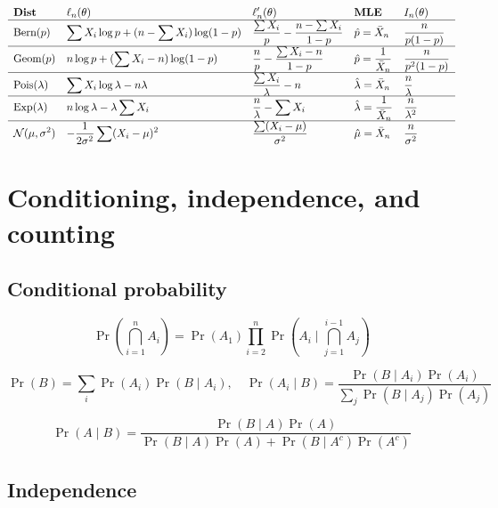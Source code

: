 \documentclass[a4paper]{article}
\begin{document}
\renewcommand*{\arraystretch}{1.8}
\[
\begin{array}{*5{>{\displaystyle}l}}
\textbf{Dist} 
& \ell_n(\theta) 
& \ell_n'(\theta) 
& \textbf{MLE} 
& I_n(\theta) \\ \hline

\text{Bern}(p) 
& \sum X_i \log p + (n-\sum X_i)\log(1-p)
& \frac{\sum X_i}{p}-\frac{n-\sum X_i}{1-p}
& \hat p=\bar X_n
& \frac{n}{p(1-p)} \\ \hline

\text{Geom}(p)
& n\log p + (\sum X_i-n)\log(1-p)
& \frac{n}{p}-\frac{\sum X_i-n}{1-p}
& \hat p=\frac1{\bar X_n}
& \frac{n}{p^2(1-p)} \\ \hline

\text{Pois}(\lambda)
& \sum X_i \log\lambda - n\lambda
& \frac{\sum X_i}{\lambda}-n
& \hat\lambda=\bar X_n
& \frac{n}{\lambda} \\ \hline

\text{Exp}(\lambda)
& n\log\lambda - \lambda\sum X_i
& \frac{n}{\lambda}-\sum X_i
& \hat\lambda=\frac1{\bar X_n}
& \frac{n}{\lambda^2} \\ \hline

\mathcal N(\mu,\sigma^2)
& -\frac{1}{2\sigma^2}\sum (X_i-\mu)^2
& \frac{\sum (X_i-\mu)}{\sigma^2}
& \hat\mu=\bar X_n
& \frac{n}{\sigma^2}

\end{array}
\]
\section{Conditioning, independence, and counting}

\subsection{Conditional probability}

\[
\Pr\!\left(\bigcap_{i=1}^n A_i\right)
= \Pr(A_1)\prod_{i=2}^n \Pr\!\left(A_i \mid \bigcap_{j=1}^{i-1} A_j\right)
\]

\[
\Pr(B)=\sum_i \Pr(A_i)\Pr(B\mid A_i),\quad
\Pr(A_i\mid B)=\frac{\Pr(B\mid A_i)\Pr(A_i)}{\sum_j \Pr(B\mid A_j)\Pr(A_j)}
\]

\[
\Pr(A\mid B)=
\frac{\Pr(B\mid A)\Pr(A)}
{\Pr(B\mid A)\Pr(A)+\Pr(B\mid A^c)\Pr(A^c)}
\]

\subsection{Independence}
\end{document}
